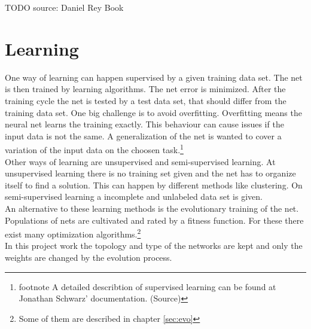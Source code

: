 \documentclass[10pt,a4paper,DIV=11]{scrreprt}
\begin{document}
TODO source: Daniel Rey Book


\section{Learning}
One way of learning can happen supervised by a given training data set. The net is then trained by learning algorithms. The net error is minimized. After the training cycle the net is tested by a test data set, that should differ from the training data set. One big challenge is to avoid overfitting. Overfitting means the neural net learns the training exactly. This behaviour can cause issues if the input data is not the same. A generalization of the net is wanted to cover a variation of the input data on the choosen task.\footnote{footnote A detailed describtion of supervised learning can be found at Jonathan Schwarz' documentation. (Source)} \\

Other ways of learning are unsupervised and semi-supervised learning. At unsupervised learning there is no training set given and the net has to organize itself to find a solution. This can happen by different methods like clustering. On semi-supervised learning a incomplete and unlabeled data set is given. \\

An alternative to these learning methods is the evolutionary training of the net. Populations of nets are cultivated and rated by a fitness function. For these there exist many optimization algorithms.\footnote{Some of them are described in chapter \ref{sec:evo}} \\

In this project work the topology and type of the networks are kept and only the weights are changed by the evolution process.
\end{document}
